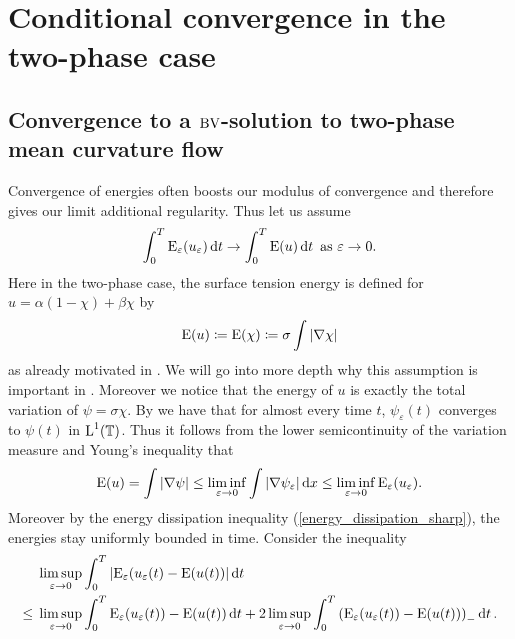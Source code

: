 \section{Conditional convergence in the two-phase case}

\subsection{Convergence to a \texorpdfstring{$ \operatorname{BV} $}{BV}-solution to two-phase 
mean curvature flow}

Convergence of energies often boosts our 
modulus of convergence and therefore gives our limit additional regularity. 
Thus let us assume 
\begin{equation}
	\label{energy_convergence}
	\int_{ 0 }^{ T }
	\operatorname{E}_{ \varepsilon } ( u_{ \varepsilon } ) 
	\dd{ t }
	\to 
	\int_{ 0 }^{ T }
	\operatorname{E} ( u )
	\dd{ t }
	\text{ as }
	\varepsilon \to 0.
\end{equation}
Here in the two-phase case, the surface tension energy is defined for $ u = 
\alpha ( 1 - \chi ) + 
\beta \chi $ by 
\begin{equation}
	\operatorname{E} ( u ) 
	\coloneqq
	\operatorname{E} ( \chi )
	\coloneqq
	\sigma \int \abs{ \nabla \chi }
\end{equation}
as already motivated in . We will go into more depth why 
this assumption is important in 
.
Moreover we notice that the energy of $ u $ is exactly the total variation of $ 
\psi = \sigma \chi $.
By 
 we have that for almost every time $ t $, $ 
\psi_{ \varepsilon } ( t ) $ 
converges to $ \psi ( t ) $ in $ \operatorname{L}^{ 1 }  ( \operatorname{\mathbb{T}} ) $. Thus it follows 
from the lower semicontinuity of 
the variation measure and Young's inequality that
\begin{equation*}
	\operatorname{E} ( u ) 
	=
	\int
	\abs{ \nabla \psi }
	\leq
	\liminf_{ \varepsilon \to 0 }
	\int
	\abs{ \nabla \psi_{ \varepsilon } }
	\dd{ x }
	\leq
	\liminf_{ \varepsilon \to 0 }
	\operatorname{E}_{ \varepsilon } ( u_{ \varepsilon } ).
\end{equation*}
Moreover by the energy dissipation inequality (\ref{energy_dissipation_sharp}), 
the energies stay uniformly bounded in time. Consider the inequality
\begin{align*}
	& \limsup_{ \varepsilon \to 0 }
		\int_{ 0 }^{ T }
			\abs{
				\operatorname{E}_{ \varepsilon } ( u_{ \varepsilon } ( t ) 
				-
				\operatorname{E} ( u ( t ) ) 
			}
		\dd{ t }
	\\
	\leq{} &
	\limsup_{ \varepsilon \to 0 }
		\int_{ 0 }^{ T }
			\operatorname{E}_{ \varepsilon } ( u_{ \varepsilon } ( t ) )
			-
			\operatorname{E} ( u ( t ) )
		\dd{ t }
	+
	2
	\limsup_{ \varepsilon \to 0 }
		\int_{ 0 }^{ T }
			\left(
				\operatorname{E}_{ \varepsilon } ( u_{ \varepsilon } ( t ) )
				-
				\operatorname{E} ( u ( t ) )
			\right)_{ - }
		\dd{ t }.
\end{align*}
